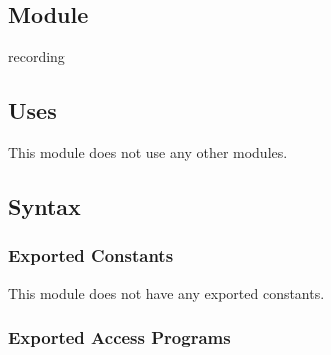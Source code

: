 \documentclass[12pt, titlepage]{article}
\begin{document}
\subsection{Module}

recording

\subsection{Uses}

This module does not use any other modules.

\subsection{Syntax}

\subsubsection{Exported Constants}

This module does not have any exported constants.

\subsubsection{Exported Access Programs}
\end{document}
